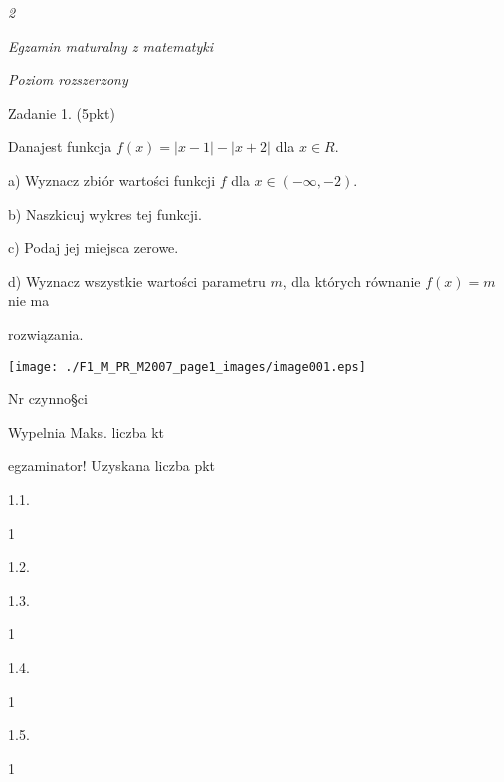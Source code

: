 \documentclass[a4paper,12pt]{article}
\begin{document}
{\it 2}

{\it Egzamin maturalny z matematyki}

{\it Poziom rozszerzony}

Zadanie 1. (5pkt)

Danajest funkcja $f(x)=|x-1|-|x+2|$ dla $x\in R.$

a) Wyznacz zbiór wartości funkcji $f$ dla $x\in(-\infty,-2).$

b) Naszkicuj wykres tej funkcji.

c) Podaj jej miejsca zerowe.

d) Wyznacz wszystkie wartości parametru $m$, dla których równanie $f(x)=m$ nie ma

rozwiązania.
\begin{center}
\texttt{[image: ./F1\_M\_PR\_M2007\_page1\_images/image001.eps]}
\end{center}
Nr czynno\S ci

Wypelnia Maks. liczba kt

egzaminator! Uzyskana liczba pkt

1.1.

1

1.2.

1.3.

1

1.4.

1

1.5.

1
\end{document}

